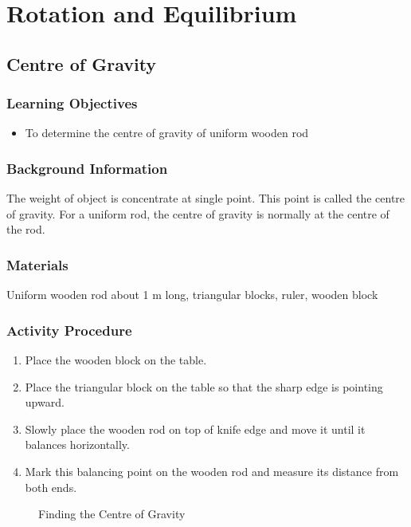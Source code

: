 \section{Rotation and Equilibrium}

\subsection{Centre of Gravity}

\subsubsection*{Learning Objectives}
\begin{itemize}
\item{To determine the centre of gravity of uniform wooden rod} 
\end{itemize}

\subsubsection*{Background Information}
The weight of object is concentrate at single point. This point is called the centre of gravity. For a uniform rod, the centre of gravity is normally at the centre of the rod.  

\subsubsection*{Materials}
Uniform wooden rod about 1 m long, triangular blocks, ruler, wooden block

\subsubsection*{Activity Procedure}
\begin{enumerate}
\item{Place the wooden block on the table.} 
\item{Place the triangular block on the table so that the sharp edge is pointing upward.} 
\item{Slowly place the wooden rod on top of knife edge and move it until it balances horizontally.} 
\item{Mark this balancing point on the wooden rod and measure its distance from both ends.} 
\end{enumerate}

\begin{figure}
\begin{center}
\def\svgwidth{175pt}

\caption{Finding the Centre of Gravity}
\label{fig:center-of-gravity}
\end{center}
\end{figure}

